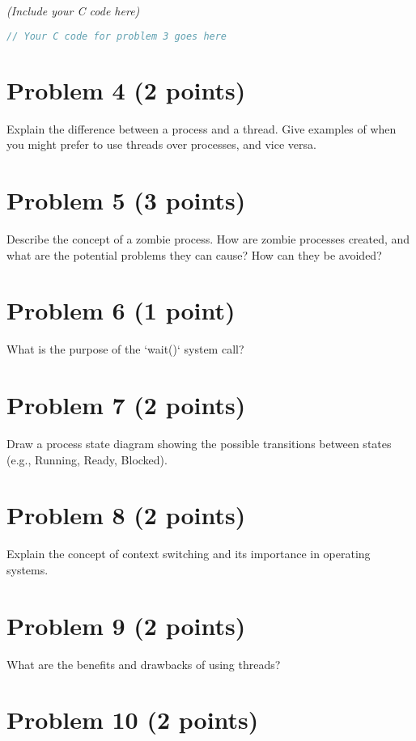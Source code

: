\documentclass{article}
\begin{document}
\textit{(Include your C code here)}

\begin{lstlisting}[language=C, caption=problem3.c, basicstyle=\ttfamily\footnotesize]
// Your C code for problem 3 goes here
\end{lstlisting}


\section*{Problem 4 (2 points)}

Explain the difference between a process and a thread.  Give examples of when you might prefer to use threads over processes, and vice versa.


\section*{Problem 5 (3 points)}

Describe the concept of a zombie process. How are zombie processes created, and what are the potential problems they can cause? How can they be avoided?


\section*{Problem 6 (1 point)}

What is the purpose of the `wait()` system call?


\section*{Problem 7 (2 points)}

Draw a process state diagram showing the possible transitions between states (e.g., Running, Ready, Blocked).


\section*{Problem 8 (2 points)}

Explain the concept of context switching and its importance in operating systems.


\section*{Problem 9 (2 points)}

What are the benefits and drawbacks of using threads?


\section*{Problem 10 (2 points)}
\end{document}
